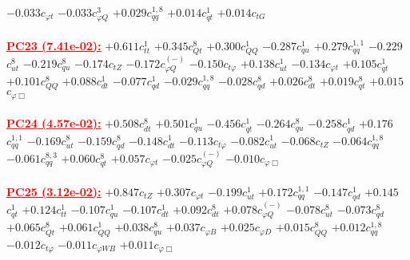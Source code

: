 \documentclass{article}
\begin{document}
{$-0.033$}{\rm $c_{\varphi t}$} 
{$-0.033$}{\rm $c_{\varphi Q}^{3}$} 
{$+0.029$}{\rm $c_{qq}^{1,8}$} 
{$+0.014$}{\rm $c_{qt}^{1}$} 
{$+0.014$}{\rm $c_{tG}$} 
 \nonumber \\ \nonumber \\ 
\noindent \textcolor{red}{\underline{\bf{PC23} (7.41e-02):}}
{$+0.611$}{\rm $c_{tt}^{1}$} 
{$+0.345$}{\rm $c_{Qt}^{8}$} 
{$+0.300$}{\rm $c_{QQ}^{1}$} 
{$-0.287$}{\rm $c_{qu}^{1}$} 
{$+0.279$}{\rm $c_{qq}^{1,1}$} 
{$-0.229$}{\rm $c_{ut}^{8}$} 
{$-0.219$}{\rm $c_{qu}^{8}$} 
{$-0.174$}{\rm $c_{tZ}$} 
{$-0.172$}{\rm $c_{\varphi Q}^{(-)}$} 
{$-0.150$}{\rm $c_{t \varphi}$} 
{$+0.138$}{\rm $c_{ut}^{1}$} 
{$-0.134$}{\rm $c_{\varphi t}$} 
{$+0.105$}{\rm $c_{qt}^{1}$} 
{$+0.101$}{\rm $c_{QQ}^{8}$} 
{$+0.088$}{\rm $c_{dt}^{1}$} 
{$-0.077$}{\rm $c_{qd}^{1}$} 
{$-0.029$}{\rm $c_{qq}^{1,8}$} 
{$-0.028$}{\rm $c_{qd}^{8}$} 
{$+0.026$}{\rm $c_{dt}^{8}$} 
{$+0.019$}{\rm $c_{qt}^{8}$} 
{$+0.015$}{\rm $c_{\varphi \Box}$} 
 \nonumber \\ \nonumber \\ 
\noindent \textcolor{red}{\underline{\bf{PC24} (4.57e-02):}}
{$+0.508$}{\rm $c_{dt}^{8}$} 
{$+0.501$}{\rm $c_{qu}^{1}$} 
{$-0.456$}{\rm $c_{qt}^{1}$} 
{$-0.264$}{\rm $c_{qu}^{8}$} 
{$-0.258$}{\rm $c_{qd}^{1}$} 
{$+0.176$}{\rm $c_{qq}^{1,1}$} 
{$-0.169$}{\rm $c_{ut}^{8}$} 
{$-0.159$}{\rm $c_{qd}^{8}$} 
{$-0.148$}{\rm $c_{dt}^{1}$} 
{$-0.113$}{\rm $c_{t \varphi}$} 
{$-0.082$}{\rm $c_{ut}^{1}$} 
{$-0.068$}{\rm $c_{tZ}$} 
{$-0.064$}{\rm $c_{qq}^{1,8}$} 
{$-0.061$}{\rm $c_{qq}^{8,3}$} 
{$+0.060$}{\rm $c_{qt}^{8}$} 
{$+0.057$}{\rm $c_{\varphi t}$} 
{$-0.025$}{\rm $c_{\varphi Q}^{(-)}$} 
{$-0.010$}{\rm $c_{\varphi \Box}$} 
 \nonumber \\ \nonumber \\ 
\noindent \textcolor{red}{\underline{\bf{PC25} (3.12e-02):}}
{$+0.847$}{\rm $c_{tZ}$} 
{$+0.307$}{\rm $c_{\varphi t}$} 
{$-0.199$}{\rm $c_{ut}^{1}$} 
{$+0.172$}{\rm $c_{qq}^{1,1}$} 
{$-0.147$}{\rm $c_{qd}^{1}$} 
{$+0.145$}{\rm $c_{qt}^{1}$} 
{$+0.124$}{\rm $c_{tt}^{1}$} 
{$-0.107$}{\rm $c_{qu}^{1}$} 
{$-0.107$}{\rm $c_{dt}^{1}$} 
{$+0.092$}{\rm $c_{dt}^{8}$} 
{$+0.078$}{\rm $c_{\varphi Q}^{(-)}$} 
{$-0.078$}{\rm $c_{ut}^{8}$} 
{$-0.073$}{\rm $c_{qd}^{8}$} 
{$+0.065$}{\rm $c_{Qt}^{8}$} 
{$+0.061$}{\rm $c_{QQ}^{1}$} 
{$+0.038$}{\rm $c_{qu}^{8}$} 
{$+0.037$}{\rm $c_{\varphi B}$} 
{$+0.025$}{\rm $c_{\varphi D}$} 
{$+0.015$}{\rm $c_{QQ}^{8}$} 
{$+0.012$}{\rm $c_{qq}^{1,8}$} 
{$-0.012$}{\rm $c_{t \varphi}$} 
{$-0.011$}{\rm $c_{\varphi WB}$} 
{$+0.011$}{\rm $c_{\varphi \Box}$} 
\end{document}

